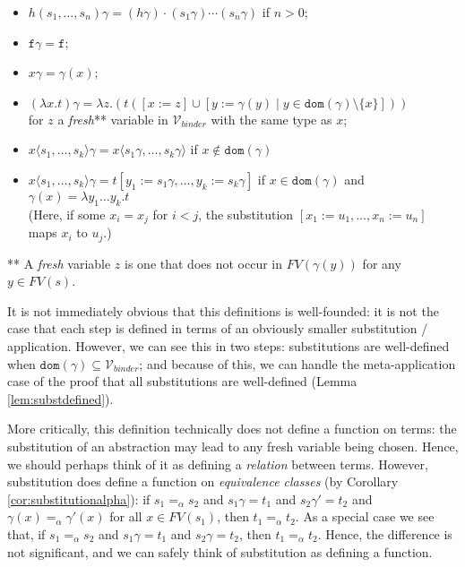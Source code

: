 \documentclass{lmcs}
\theoremstyle{theorem}\newtheorem{theorem}{Theorem}
\theoremstyle{theorem}\newtheorem{lemma}[theorem]{Lemma}
\theoremstyle{theorem}\newtheorem{corollary}[theorem]{Corollary}
\theoremstyle{definition}\newtheorem{definition}[theorem]{Definition}
\theoremstyle{definition}\newtheorem{example}[theorem]{Example}
\newcommand{\Vbound}{\mathcal{V}_{\mathit{binder}}}
\newcommand{\FV}{\mathit{FV}}
\newcommand{\domain}{\mathtt{dom}}
\newcommand{\identifier}[1]{\mathtt{#1}}
\newcommand{\afun}{\identifier{f}}
\newcommand{\avar}{x}
\newcommand{\bvar}{y}
\newcommand{\cvar}{z}
\newcommand{\abs}[2]{\lambda #1.#2}
\newcommand{\meta}[2]{#1\langle#2\rangle}
\begin{document}
\begin{itemize}
\item $h(s_1,\dots,s_n)\gamma = (h\gamma) \cdot (s_1\gamma) \cdots (s_n\gamma)$ if $n > 0$;
\item $\afun\gamma = \afun$;
\item $\avar\gamma = \gamma(\avar)$;
\item $(\abs{\avar}{t})\gamma = \abs{\cvar}{(t ([\avar:=\cvar] \cup [\bvar:=\gamma(\bvar) \mid
  \bvar \in \domain(\gamma) \setminus \{\avar\}]))}$ \\
  for $\cvar$ a \emph{fresh}** variable in $\Vbound$ with the same type as $\avar$;
\item $\meta{\avar}{s_1,\dots,s_k}\gamma = \meta{\avar}{s_1\gamma,\dots,s_k\gamma}$ if
  $\avar \notin \domain(\gamma)$
\item $\meta{\avar}{s_1,\dots,s_k}\gamma = t[\bvar_1:=s_1\gamma,\dots,\bvar_k:=s_k\gamma]$
  if $\avar \in \domain(\gamma)$ and $\gamma(\avar) = \abs{\bvar_1 \dots \bvar_k}{t}$ \\
  (Here, if some $x_i = x_j$ for $i < j$, the substitution $[x_1:=u_1,\dots,x_n:=u_n]$ maps
  $x_i$ to $u_j$.)
\end{itemize}
** A \emph{fresh} variable $\cvar$ is one that does not occur in $\FV(\gamma(\bvar))$ for any
$\bvar \in \FV(s)$.

It is not immediately obvious that this definitions is well-founded: it is not the case that each
step is defined in terms of an obviously smaller substitution / application.  However, we can see
this in two steps: substitutions are well-defined when $\domain(\gamma) \subseteq \Vbound$; and
because of this, we can handle the meta-application case of the proof that all substitutions are
well-defined (Lemma \ref{lem:substdefined}).

More critically, this definition technically does not define a function on terms: the substitution
of an abstraction may lead to any fresh variable being chosen.  Hence, we should perhaps think of
it as defining a \emph{relation} between terms.  However, substitution does define a function on
\emph{equivalence classes} (by Corollary \ref{cor:substitutionalpha}):
  if $s_1 =_\alpha s_2$ and $s_1\gamma = t_1$ and $s_2\gamma' = t_2$ and $\gamma(x) =_\alpha
  \gamma'(x)$ for all $x \in \FV(s_1)$, then $t_1 =_\alpha t_2$.
As a special case we see that, if $s_1 =_\alpha s_2$ and $s_1\gamma = t_1$ and $s_2\gamma = t_2$,
  then $t_1 =_\alpha t_2$.
Hence, the difference is not significant, and we can safely think of substitution as defining a
function.
\end{document}
